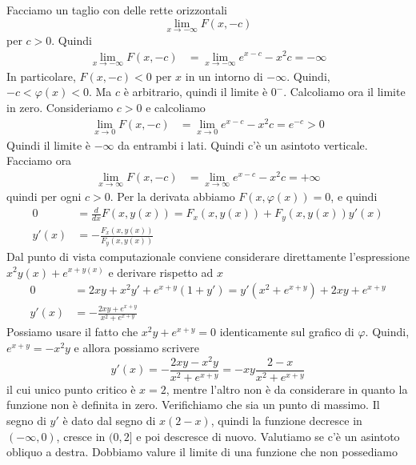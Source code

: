 \documentclass[a4paper]{article}
\begin{document}
{    Facciamo un taglio con delle rette orizzontali
    \[
        \lim_{x\to -\infty} F(x, -c)
    \]
    per \(c>0\). Quindi
    \begin{align*}
        \lim_{x\to -\infty} F(x, -c)
        &= \lim_{x\to -\infty} e^{x-c} -x^2c = -\infty
    \end{align*}
    In particolare, \(F(x, -c) < 0\) per \(x\) in un intorno di \(-\infty\).
    Quindi, \(-c < \varphi(x) < 0\).
    Ma \(c\) è arbitrario, quindi il limite è \(0^-\).
    Calcoliamo ora il limite in zero.
    Consideriamo \(c>0\) e calcoliamo
    \begin{align*}
        \lim_{x\to 0} F(x, -c)
        &= \lim_{x\to 0} e^{x-c} -x^2c = e^{-c} > 0
    \end{align*}
    Quindi il limite è \(-\infty\) da entrambi i lati.
    Quindi c'è un asintoto verticale.
    Facciamo ora
        \begin{align*}
        \lim_{x\to \infty} F(x, -c)
        &= \lim_{x\to \infty} e^{x-c} -x^2c = +\infty
    \end{align*}
    quindi per ogni \(c>0\).
    Per la derivata abbiamo \(F(x, \varphi(x))=0\),
    e quindi
    \begin{align*}
        0 &= \frac{d}{dx} F(x,y(x))
        = F_x(x, y(x)) + F_y(x, y(x)) y'(x) \\
        y'(x) &= -\frac{F_x(x, y(x))}{F_y(x, y(x))}
    \end{align*}
    Dal punto di vista computazionale conviene considerare direttamente l'espressione
    \(x^2y(x) + e^{x + y(x)}\) e derivare rispetto ad \(x\)
    \begin{align*}
        0 &= 2xy + x^2y' + e^{x+y}(1 + y')
        = y'(x^2 + e^{x+y}) + 2xy + e^{x+y} \\
        y'(x) &= -\frac{2xy + e^{x+y}}{x^2 + e^{x+y}}
    \end{align*}
    Possiamo usare il fatto che \(x^2y + e^{x+y} = 0\) identicamente sul grafico di \(\varphi\).
    Quindi, \(e^{x+y} = -x^2y\) e  allora possiamo scrivere
    \[
        y'(x) = - \frac{2xy - x^2y}{x^2 + e^{x+y}}
        = - xy \frac{2-x}{x^2 + e^{x+y}}
    \]
    il cui unico punto critico è \(x=2\), mentre l'altro non è
    da considerare in quanto la funzione non è definita in zero.
    Verifichiamo che sia un punto di massimo.
    Il segno di \(y'\) è dato dal segno di \(x(2-x)\),
    quindi la funzione decresce in \((-\infty, 0)\),
    cresce in \((0, 2]\) e poi descresce di nuovo.
    Valutiamo se c'è un asintoto obliquo
    a destra. Dobbiamo valure il limite di una funzione che non possediamo
}
\end{document}
